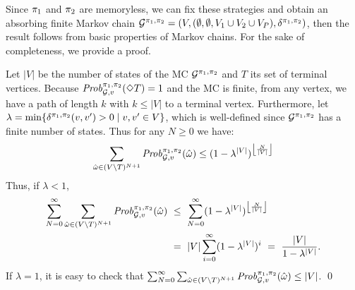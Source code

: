 \begin{myproof}
  Since $\pi_{1}$ and $\pi_{2}$ are memoryless, we can fix these
  strategies and obtain an absorbing finite Markov chain
  $\mathcal{G}^{\pi_{1},\pi_{2}} = (V, (\emptyset,\emptyset, V_1 \cup V_2 \cup V_P), \delta^{\pi_{1}, \pi_{2}})$,
  then the result follows from basic properties of Markov chains. For
  the sake of completeness, we provide a proof.
  
  Let $|V|$ be the number of states of the MC
  $\mathcal{G}^{\pi_{1},\pi_{2}}$ and $T$ its set of terminal
  vertices.
  Because $\mathit{Prob}^{\pi_{1}, \pi_{2}}_{\mathcal{G},v}(\Diamond T) = 1$
  and the MC is finite, from any vertex, we have a path of length $k$
  with $k \leq|V|$ to a terminal vertex.
  Furthermore, let
  $\lambda = \min \{ \delta^{\pi_{1},\pi_{2}}(v,v') > 0 \mid v,v' \in V \}$,
  which is well-defined since $\mathcal{G}^{\pi_{1},\pi_{2}}$ has a finite
  number of states. Thus for any $N\geq 0$ we have:
  \[
  \sum_{\hat{\omega} \in (V \setminus T)^{N+1}} \mathit{Prob}^{\pi_{1}, \pi_{2}}_{\mathcal{G},v}(\hat{\omega}) \leq (1 - \lambda^{|V|})^{\left\lfloor{\frac{N}{|V|}}\right\rfloor}
  \]
  Thus, if $\lambda<1$,
  \begin{align*}
    \sum^\infty_{N=0}\sum_{\hat{\omega} \in (V \setminus T)^{N+1}} \Prob{\strat{1}}{\strat{2}}_{\StochG,v}(\hat{\omega}) & \ \leq \ \sum^{\infty}_{N=0}(1 - \lambda^{|V|})^{\left\lfloor{\frac{N}{|V|}}\right\rfloor} \\
    & \ = \ {|V|}\sum^{\infty}_{i=0}(1 - \lambda^{|V|})^i \ = \ \frac{|V|}{1 - \lambda^{|V|}}.
  \end{align*}
  If $\lambda = 1$, it is easy to check that
  $\sum^\infty_{N=0}\sum_{\hat{\omega} \in (V \setminus T)^{N+1}} \mathit{Prob}^{\pi_{1}, \pi_{2}}_{\mathcal{G},v}(\hat{\omega}) \leq {|V|}$.
  \qed
\end{myproof}



